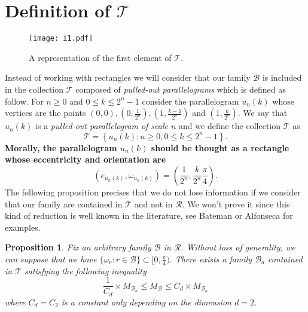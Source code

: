 \documentclass{article}
\newtheorem{prp}{Proposition}
\begin{document}
\section{Definition of $\mathcal{T}$}\label{S:Def of}



\begin{figure}[h!]
\centering
\texttt{[image: i1.pdf]}
\caption{A representation of the first element of $\mathcal{T}$.}  
\end{figure}



Instead of working with rectangles we will consider that our family $\mathcal{B}$ is included in the collection $\mathcal{T}$ composed of \textit{pulled-out parallelograms} which is defined as follow. For $n \geq 0$ and $0 \leq k \leq 2^n-1$ consider the parallelogram $u_n(k)$  whose vertices are the points $(0,0),(0, \frac{1}{2^n}),(1,\frac{k-1}{2^n})$ and $(1,\frac{k}{2^n})$. We say that $u_n(k)$ is a \textit{pulled-out parallelogram of scale $n$} and we define the collection $\mathcal{T}$ as $$\mathcal{T} = \left\{ u_n(k) : n \geq 0, 0 \leq k \leq 2^n-1 \right\}.$$ \textbf{Morally, the parallelogram $u_n(k)$ should be thought as a rectangle whose eccentricity and orientation are $$\left( e_{u_n(k)}, \omega_{u_n(k)} \right) = \left(  \frac{1}{2^n},  \frac{k}{2^n}\frac{\pi}{4} \right).$$ }The following proposition precises that we do not lose information if we consider that our family are contained in $\mathcal{T}$ and not in $\mathcal{R}$. We won't prove it since this kind of reduction is well known in the literature, see Bateman \cite{BATEMAN} or Alfonseca \cite{ALFONSECA} for examples.

\begin{prp}\label{ P : approx }
Fix an arbitrary family $\mathcal{B}$ in $\mathcal{R}$. Without loss of generality, we can suppose that we have $\{ \omega_r : r \in \mathcal{B} \} \subset [0,\frac{\pi}{4}).$ There exists a family $\mathcal{B}_a$ contained in $\mathcal{T}$ satisfying the following inequality $$\frac{1}{C_d} \times M_{\mathcal{B}_a}  \leq M_\mathcal{B} \leq {C_d} \times M_{\mathcal{B}_a}$$ where $C_d = C_2$ is a constant only depending on the dimension $d = 2$.
\end{prp}
\end{document}
